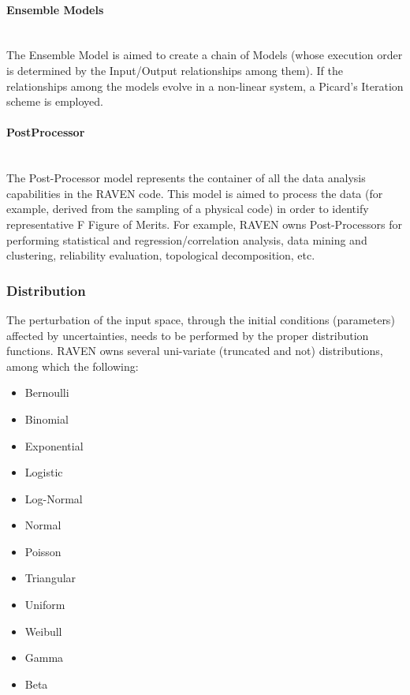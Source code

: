 \paragraph{Ensemble Models} ~\\
The Ensemble Model is aimed to create a chain of Models (whose execution order is determined by the Input/Output 
relationships among them). If the relationships among the models evolve in a non-linear system, a Picard’s Iteration 
scheme is employed.

\paragraph{PostProcessor} ~\\
The Post-Processor model represents the container of all the data analysis capabilities in the RAVEN code. This model is 
aimed to process the data (for example, derived from the sampling of a physical code) in order to identify representative F
Figure of Merits. For example, RAVEN owns Post-Processors for performing statistical and regression/correlation analysis, 
data mining and clustering, reliability evaluation, topological decomposition, etc.

\subsubsection{Distribution}
The perturbation of the input space, through the initial conditions (parameters) affected by uncertainties, needs to be 
performed by the proper distribution functions. RAVEN owns several uni-variate (truncated and not) distributions, among which the following: 
\begin{itemize}
  \item  Bernoulli
  \item  Binomial
  \item  Exponential
  \item  Logistic
  \item  Log-Normal
  \item  Normal  
  \item  Poisson  
  \item  Triangular  
  \item  Uniform
  \item  Weibull
  \item  Gamma
  \item  Beta
\end{itemize}

